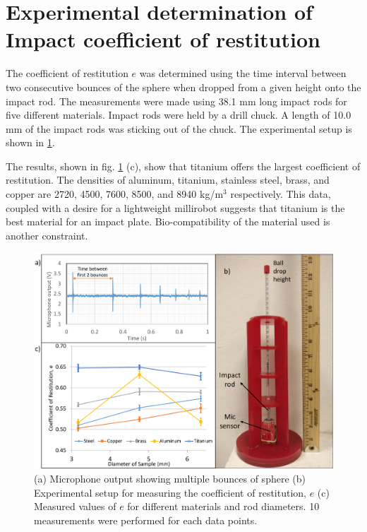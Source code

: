 \documentclass[letterpaper, 10 pt, conference]{ieeeconf}  %
\begin{document}
\section{Experimental determination of Impact coefficient of restitution}
\label{cor_det}
The coefficient of restitution $e$ was determined using the time interval between two consecutive bounces of the sphere when dropped from a given height onto the impact rod. The measurements were made using 38.1 mm long impact rods for five different materials. Impact rods were held by a drill chuck. A length of 10.0 mm of the impact rods was sticking out of the chuck. The experimental setup is shown in \cref{CoR_setup_data}.

The results, shown in fig. \ref{CoR_setup_data} (c), show that titanium offers the largest coefficient of restitution. The densities of aluminum, titanium, stainless steel, brass, and copper are 2720, 4500, 7600, 8500, and 8940 kg/m$^3$ respectively. This data, coupled with a desire for a lightweight millirobot suggests that titanium is the best material for an impact plate. Bio-compatibility of the material used is another constraint.

\begin{figure}
	\includegraphics[width=\columnwidth]{CoR_setup_data.pdf}
	\caption{(a) Microphone output showing multiple bounces of sphere (b) Experimental setup for measuring the coefficient of restitution, $e$ (c) Measured values of $e$ for different materials and rod diameters. 10 measurements were performed for each data points.}
	\label{CoR_setup_data}
	\vspace{-1.5em}
\end{figure}
\end{document}
